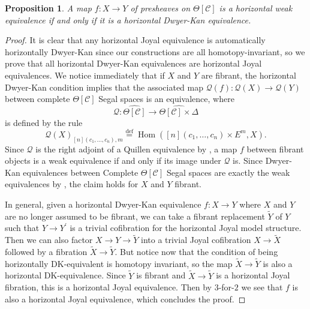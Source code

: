 \documentclass[leqno]{article}
\numberwithin{equation}{subsection}
\theoremstyle{plain}   %
\newtheorem{prop}[equation]{Proposition}
\theoremstyle{remark}
\theoremstyle{plain}
\DeclareMathOperator{\Hom}{Hom}
\newcommand{\psh}[1]{\ensuremath{\widehat{#1}}}
\providecommand{\C}{}
\renewcommand{\C}{\ensuremath{\mathcal{C}}}
\newcommand{\defeq}{\overset{\mathrm{def}}=}
\newcommand{\cellset}{\ensuremath{\widehat{\Theta[\mathcal{C}]}}}
\begin{document}
\begin{prop} A map \(f:X\to Y\) of presheaves on \(\Theta[\C]\) is a horizontal weak equivalence if and only if it is a horizontal Dwyer-Kan equivalence.
\end{prop}
\begin{proof}
	It is clear that any horizontal Joyal equivalence is automatically horizontally Dwyer-Kan since our constructions are all homotopy-invariant, so we prove that all horizontal Dwyer-Kan equivalences are horizontal Joyal equivalences.  We notice immediately that if \(X\) and \(Y\) are fibrant, the horizontal Dwyer-Kan condition implies that the associated map \(\mathcal{Q}(f):\mathcal{Q}(X)\to \mathcal{Q}(Y)\) between complete \(\Theta[\C]\) Segal spaces is an equivalence, where
	\[\mathcal{Q}:\cellset \to \psh{\Theta[\C]\times \Delta}\]
	is defined by the rule
	\[\mathcal{Q}(X)_{[n](c_1,\dots,c_n),m} \defeq\Hom([n](c_1,\dots,c_n)\times E^m,X).\]
	Since \(\mathcal{Q}\) is the right adjoint of a Quillen equivalence by , a map \(f\) between fibrant objects is a weak equivalence if and only if its image under \(\mathcal{Q}\) is. Since Dwyer-Kan equivalences between Complete \(\Theta[\C]\) Segal spaces are exactly the weak equivalences by \cite{rezk-theta-n-spaces}, the claim holds for \(X\) and \(Y\) fibrant.

	In general, given a horizontal Dwyer-Kan equivalence \(f:X\to Y\) where \(X\) and \(Y\) are no longer assumed to be fibrant, we can take a fibrant replacement \(\tilde{Y}\) of \(Y\) such that \(Y\to Y^\prime\) is a trivial cofibration for the horizontal Joyal model structure.  Then we can also factor \(X\to Y\to \tilde{Y}\) into a trivial Joyal cofibration \(X\to \tilde{X}\) followed by a fibration \(\tilde{X}\to \tilde{Y}\).  But notice now that the condition of being horizontally DK-equivalent is homotopy invariant, so the map \(\tilde{X}\to \tilde{Y}\) is also a horizontal DK-equivalence.  Since \(\tilde{Y}\) is fibrant and \(\tilde{X}\to \tilde{Y}\) is a horizontal Joyal fibration, this is a horizontal Joyal equivalence.  Then by \(3\)-for-\(2\)  we see that \(f\) is also a horizontal Joyal equivalence, which concludes the proof.
\end{proof}
\end{document}
